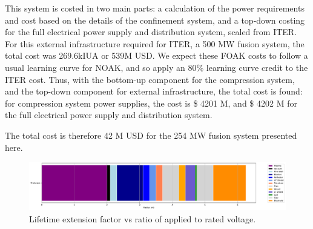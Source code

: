 
This system is costed in two main parts: a calculation of the power requirements and cost based on the details of the confinement system, and a top-down costing for the full electrical power supply and distribution system, scaled from ITER. For this external infrastructure required for ITER, a 500 MW fusion system, the total cost was 269.6kIUA or 539M USD. 
We expect these FOAK costs to follow a usual learning curve for NOAK, and so apply an 80\% learning curve credit to the ITER cost. Thus, with the bottom-up component for the compression system, and the top-down component for external infrastructure, the total cost is found: for compression system power supplies, the cost is \$ 4201 M, and \$ 4202 M for the full electrical power supply and distribution system. 

The total cost is therefore 42 M USD for the 254 MW fusion system presented here. 

\begin{figure}[h!]
    \centering
    \includegraphics[scale=0.4]{Figures/cap_derate.pdf}
    \caption{Lifetime extension factor vs ratio of applied to rated voltage.}
    \label{fig:derate}
\end{figure}



